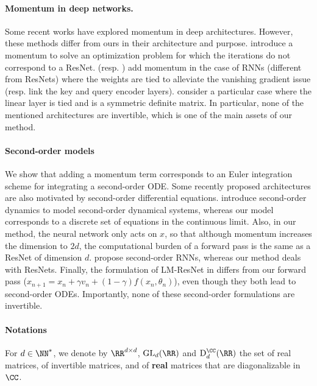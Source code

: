 \documentclass{article}
\begin{document}
\paragraph{Momentum in deep networks.} Some recent works \citep{he2020momentum, chun2020momentum,  nguyen2020momentumrnn, li2018optimization} have explored momentum in deep architectures. However, these methods differ from ours in their architecture and purpose. \citet{chun2020momentum} introduce a momentum to solve an optimization problem for which the iterations do not correspond to a ResNet. 
\citet{nguyen2020momentumrnn} (resp. \citet{he2020momentum}) add momentum in the case of RNNs (different from ResNets) where the weights are tied to alleviate the vanishing gradient issue (resp. link the key and query encoder layers). \citet{li2018optimization} consider a particular case where the linear layer is tied and is a symmetric definite matrix. In particular, none of the mentioned architectures are invertible, which is one of the main assets of our method.
\vspace{-1em}
\paragraph{Second-order models} We show that adding a momentum term corresponds to an Euler integration scheme for integrating a second-order ODE. Some recently proposed architectures \citep{norcliffe2020second, rusch2020coupled, lu2017finite, massaroli2020dissecting} are also motivated by second-order differential equations. \citet{norcliffe2020second} introduce second-order dynamics to model second-order dynamical systems, whereas our model corresponds to a discrete set of equations in the continuous limit. Also, in our method, the neural network only acts on $x$, so that although momentum increases the dimension to $2d$, the computational burden of a forward pass is the same as a ResNet of dimension $d$. \citet{rusch2020coupled} propose second-order RNNs, whereas our method deals with ResNets. Finally, the formulation of LM-ResNet in \citet{lu2017finite} differs from our forward pass ($x_{n+1} = x_n + \gamma  v_n + (1-\gamma)f(x_n,\theta_n)$), even though they both lead to second-order ODEs. Importantly, none of these second-order formulations are invertible.
\vspace{-1em}
\paragraph{Notations}
For $d\in \NN^{*}$, we denote by $\RR^{d \times d}$, $\mathrm{GL}_d{(\RR)}$ and $\mathrm{D}_{d}^{\CC}(\RR)$ the set of real matrices, of invertible matrices, and of \textbf{real} matrices that are diagonalizable in $\CC$. 
\end{document}
